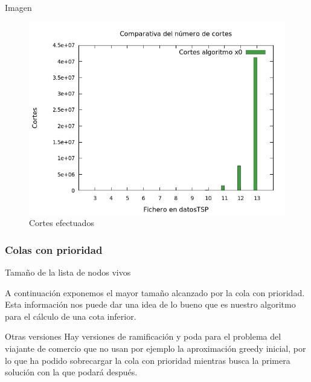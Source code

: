 \begin{frame}
	\begin{exampleblock}{Imagen}
	\begin{figure}[H]
    		\centering
	    \includegraphics[scale=0.35]{../TSP/Graficas/graficaCortes.png}
    		\caption{Cortes efectuados}
	\end{figure}
	\end{exampleblock}
\end{frame}



\subsubsection{Colas con prioridad}
\begin{frame}{Tamaño de la lista de nodos vivos}
	\begin{block}{ }
	A continuación exponemos el mayor tamaño alcanzado por la cola con prioridad.
	Esta información nos puede dar una idea de lo bueno que es nuestro algoritmo 
	para el cálculo de una cota inferior.
	\end{block}
	
	\begin{block}{Otras versiones}
	Hay versiones de ramificación y poda para el problema del viajante
	de comercio que no usan por ejemplo la aproximación greedy inicial, por lo que ha podido 
	sobrecargar la cola con prioridad mientras busca la primera solución con la que podará después.
	\end{block}
\end{frame}

